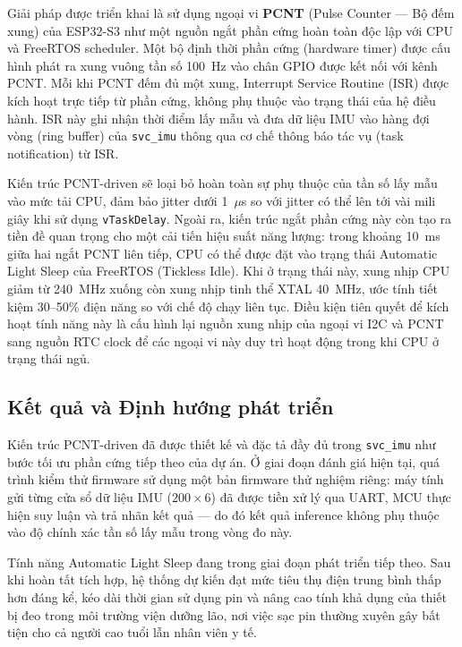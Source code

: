 \documentclass[../DoAn.tex]{subfiles}
\begin{document}
Giải pháp được triển khai là sử dụng ngoại vi \textbf{PCNT} (Pulse Counter --- Bộ đếm xung) của ESP32-S3 như một nguồn ngắt phần cứng hoàn toàn độc lập với CPU và FreeRTOS scheduler. Một bộ định thời phần cứng (hardware timer) được cấu hình phát ra xung vuông tần số 100~Hz vào chân GPIO được kết nối với kênh PCNT. Mỗi khi PCNT đếm đủ một xung, Interrupt Service Routine (ISR) được kích hoạt trực tiếp từ phần cứng, không phụ thuộc vào trạng thái của hệ điều hành. ISR này ghi nhận thời điểm lấy mẫu và đưa dữ liệu IMU vào hàng đợi vòng (ring buffer) của \texttt{svc\_imu} thông qua cơ chế thông báo tác vụ (task notification) từ ISR.

Kiến trúc PCNT-driven sẽ loại bỏ hoàn toàn sự phụ thuộc của tần số lấy mẫu vào mức tải CPU, đảm bảo jitter dưới 1~$\mu$s so với jitter có thể lên tới vài mili giây khi sử dụng \texttt{vTaskDelay}. Ngoài ra, kiến trúc ngắt phần cứng này còn tạo ra tiền đề quan trọng cho một cải tiến hiệu suất năng lượng: trong khoảng 10~ms giữa hai ngắt PCNT liên tiếp, CPU có thể được đặt vào trạng thái Automatic Light Sleep của FreeRTOS (Tickless Idle). Khi ở trạng thái này, xung nhịp CPU giảm từ 240~MHz xuống còn xung nhịp tinh thể XTAL 40~MHz, ước tính tiết kiệm 30--50\% điện năng so với chế độ chạy liên tục. Điều kiện tiên quyết để kích hoạt tính năng này là cấu hình lại nguồn xung nhịp của ngoại vi I2C và PCNT sang nguồn RTC clock để các ngoại vi này duy trì hoạt động trong khi CPU ở trạng thái ngủ.

\subsection{Kết quả và Định hướng phát triển}

Kiến trúc PCNT-driven đã được thiết kế và đặc tả đầy đủ trong \texttt{svc\_imu} như bước tối ưu phần cứng tiếp theo của dự án. Ở giai đoạn đánh giá hiện tại, quá trình kiểm thử firmware sử dụng một bản firmware thử nghiệm riêng: máy tính gửi từng cửa sổ dữ liệu IMU ($200 \times 6$) đã được tiền xử lý qua UART, MCU thực hiện suy luận và trả nhãn kết quả --- do đó kết quả inference không phụ thuộc vào độ chính xác tần số lấy mẫu trong vòng đo này.

Tính năng Automatic Light Sleep đang trong giai đoạn phát triển tiếp theo. Sau khi hoàn tất tích hợp, hệ thống dự kiến đạt mức tiêu thụ điện trung bình thấp hơn đáng kể, kéo dài thời gian sử dụng pin và nâng cao tính khả dụng của thiết bị đeo trong môi trường viện dưỡng lão, nơi việc sạc pin thường xuyên gây bất tiện cho cả người cao tuổi lẫn nhân viên y tế.
\end{document}

